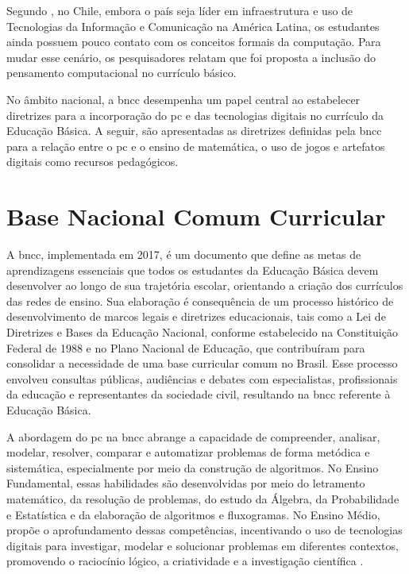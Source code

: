 Segundo \cite{brackmann2016computational}, no Chile, embora o país seja líder em
infraestrutura e uso de Tecnologias da Informação e Comunicação na América
Latina, os estudantes ainda possuem pouco contato com os conceitos formais da
computação. Para mudar esse cenário, os pesquisadores relatam que foi proposta
a inclusão do pensamento computacional no currículo básico.


No âmbito nacional, a \gls{bncc} desempenha um papel
central ao estabelecer diretrizes para a incorporação do \gls{pc} e das tecnologias
digitais no currículo da Educação Básica. A seguir, são apresentadas as
diretrizes definidas pela \gls{bncc} para a relação entre o \gls{pc} e o ensino de
matemática, o uso de jogos e artefatos digitais como recursos pedagógicos.


\section{ Base Nacional Comum Curricular }
A \gls{bncc}, implementada em 2017, é um documento
que define as metas de aprendizagens essenciais que todos os estudantes da
Educação Básica devem desenvolver ao longo de sua trajetória escolar, orientando
a criação dos currículos das redes de ensino. Sua elaboração é consequência de um
processo histórico de desenvolvimento de marcos legais e diretrizes educacionais, tais
como a Lei de Diretrizes e Bases da Educação Nacional, conforme estabelecido na
Constituição Federal de 1988 e no Plano Nacional de Educação, que contribuíram
para consolidar a necessidade de uma base curricular comum no Brasil. Esse
processo envolveu consultas públicas, audiências e debates com especialistas,
profissionais da educação e representantes da sociedade civil, resultando na
\gls{bncc} referente à Educação Básica.


A abordagem do \gls{pc} na \gls{bncc} abrange a capacidade de compreender, analisar,
modelar, resolver, comparar e automatizar problemas de forma metódica e
sistemática, especialmente por meio da construção de algoritmos. No Ensino
Fundamental, essas habilidades são desenvolvidas por meio do letramento
matemático, da resolução de problemas, do estudo da Álgebra, da Probabilidade e
Estatística e da elaboração de algoritmos e fluxogramas. No Ensino Médio,
propõe o aprofundamento dessas competências, incentivando o uso de tecnologias
digitais para investigar, modelar e solucionar problemas em diferentes
contextos, promovendo o raciocínio lógico, a criatividade e a investigação
científica \cite{brasil2017}.


